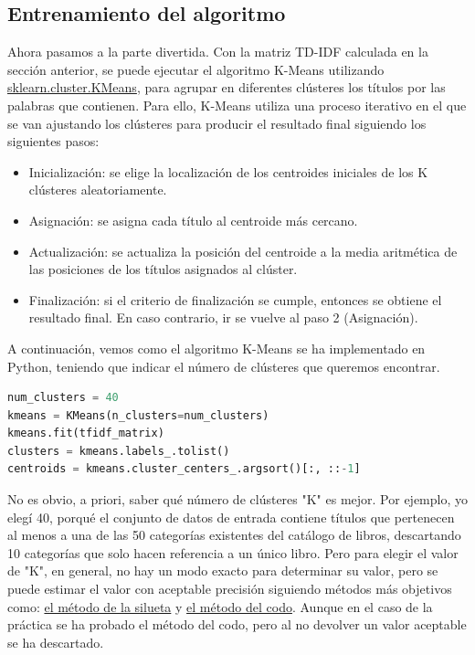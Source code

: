 \documentclass{uimppracticas}
\begin{document}
\subsection{Entrenamiento del algoritmo}

Ahora pasamos a la parte divertida. Con la matriz TD-IDF calculada en la sección anterior, se puede ejecutar el algoritmo K-Means utilizando \href{https://scikit-learn.org/stable/modules/generated/sklearn.cluster.KMeans.html}{sklearn.cluster.KMeans}, para agrupar en diferentes clústeres los títulos por las palabras que contienen. Para ello, K-Means utiliza una proceso iterativo en el que se van ajustando los clústeres para producir el resultado final siguiendo los siguientes pasos:

\begin{itemize}
	\item Inicialización: se elige la localización de los centroides iniciales de los K clústeres aleatoriamente.
	\item Asignación: se asigna cada título al centroide más cercano.
	\item Actualización: se actualiza la posición del centroide a la media aritmética de las posiciones de los títulos asignados al clúster.
	\item Finalización: si el criterio de finalización se cumple, entonces se obtiene el resultado final. En caso contrario, ir se vuelve al paso 2 (Asignación).
\end{itemize}

A continuación, vemos como el algoritmo K-Means se ha implementado en Python, teniendo que indicar el número de clústeres que queremos encontrar.

\begin{lstlisting}[language=python]
num_clusters = 40
kmeans = KMeans(n_clusters=num_clusters)
kmeans.fit(tfidf_matrix)
clusters = kmeans.labels_.tolist()
centroids = kmeans.cluster_centers_.argsort()[:, ::-1]
\end{lstlisting}

No es obvio, a priori, saber qué número de clústeres "K" es mejor. Por ejemplo, yo elegí 40, porqué el conjunto de datos de entrada contiene títulos que pertenecen al menos a una de las 50 categorías existentes del catálogo de libros, descartando 10 categorías que solo hacen referencia a un único libro. Pero para elegir el valor de "K", en general, no hay un modo exacto para determinar su valor, pero se puede estimar el valor con aceptable precisión siguiendo métodos más objetivos como: \href{https://en.wikipedia.org/wiki/Silhouette_(clustering)}{el método de la silueta} y \href{https://en.wikipedia.org/wiki/Elbow_method_(clustering)}{el método del codo}. Aunque en el caso de la práctica se ha probado el método del codo, pero al no devolver un valor aceptable se ha descartado.  
\end{document}
